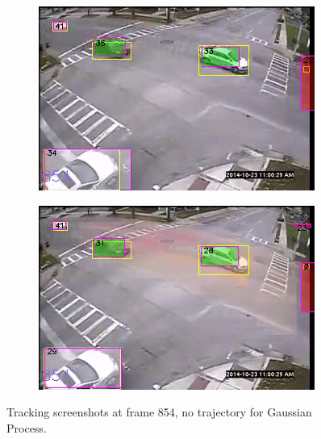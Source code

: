 \begin{figure}[!ht]
\centering
    \begin{subfigure}{0.43\linewidth}
        \includegraphics[width=\linewidth]{./img/gp/193402-kf-1.png}
        \label{subfig:kf-1}
    \end{subfigure}
    \begin{subfigure}{0.43\linewidth}
        \includegraphics[width=\linewidth]{./img/gp/193402-gp-1.png}
        \label{subfig:gp-1}
    \end{subfigure}%
    \caption{Tracking screenshots at frame 854, no trajectory for Gaussian Process.}
    \label{fig:kf-gp-1}
\end{figure}

